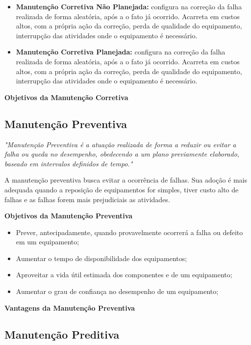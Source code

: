 		\begin{itemize}
			\item \textbf{Manutenção Corretiva Não Planejada:} configura na correção da falha realizada de forma aleatória, após a o fato já ocorrido. Acarreta em custos altos, com a própria ação da correção, perda de qualidade do equipamento, interrupção das atividades onde o equipamento é necessário.
			\item \textbf{Manutenção Corretiva Planejada:} configura na correção da falha realizada de forma aleatória, após a o fato já ocorrido. Acarreta em custos altos, com a própria ação da correção, perda de qualidade do equipamento, interrupção das atividades onde o equipamento é necessário.
		\end{itemize}

		\textbf{Objetivos da Manutenção Corretiva}



\subsection{Manutenção Preventiva}

		\emph{"Manutenção Preventiva é a atuação realizada de forma a reduzir ou evitar a falha ou queda no desempenho, obedecendo a um plano previamente elaborado, baseado em intervalos definidos de tempo."} \cite{kardecnascif2010}

		A manutenção preventiva busca evitar a ocorrência de falhas. Sua adoção é mais adequada quando a reposição de equipamentos for simples, tiver custo alto de falhas e as falhas forem mais prejudiciais as atividades.


		\textbf{Objetivos da Manutenção Preventiva}

			\begin{itemize}
				\item Prever, antecipadamente, quando provavelmente ocorrerá a falha ou defeito em um equipamento;    
				\item Aumentar o tempo de disponibilidade dos equipamentos; 
				\item Aproveitar a vida útil estimada dos componentes e de um equipamento; 
				\item Aumentar o grau de confiança no desempenho de um equipamento; 
			\end{itemize}

		\textbf{Vantagens da Manutenção Preventiva}

\subsection{Manutenção Preditiva}

